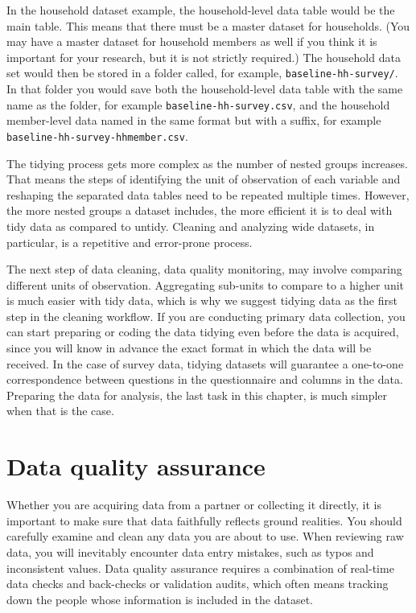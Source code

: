 In the household dataset example,
the household-level data table would be the main table.
This means that there must be a master dataset for households.
(You may have a master dataset for household members as well
if you think it is important for your research,
but it is not strictly required.)
The household data set would then be stored in a folder called,
for example, \texttt{baseline-hh-survey/}.
In that folder you would save both
the household-level data table with the same name as the folder,
for example \texttt{baseline-hh-survey.csv},
and the household member-level data named in the same format but with a suffix,
for example \texttt{baseline-hh-survey-hhmember.csv}.

The tidying process gets more complex as the number of nested groups increases.
That means the steps of identifying the unit of observation of each variable
and reshaping the separated data tables need to be repeated multiple times.
However, the more nested groups a dataset includes,
the more efficient it is to deal with tidy data as compared to untidy.
Cleaning and analyzing wide datasets, in particular,
is a repetitive and error-prone process.

The next step of data cleaning, data quality monitoring,
may involve comparing different units of observation.
Aggregating sub-units to compare to a higher unit is much easier with tidy data,
which is why we suggest tidying data as the first step in the cleaning workflow.
If you are conducting primary data collection,
you can start preparing or coding the data tidying even before the data is acquired,
since you will know in advance the exact format in which the data will be received.
In the case of survey data,
tidying datasets will guarantee a one-to-one correspondence
between questions in the questionnaire and columns in the data.
Preparing the data for analysis, the last task in this chapter,
is much simpler when that is the case.

\section{Data quality assurance}

Whether you are acquiring data from a partner or collecting it directly,
it is important to make sure that data faithfully reflects ground realities.
You should carefully examine and clean any data you are about to use.
When reviewing raw data, you will inevitably encounter data entry mistakes,
such as typos and inconsistent values.
Data quality assurance requires a combination of real-time data checks
and back-checks or validation audits, which often means tracking down
the people whose information is included in the dataset.


